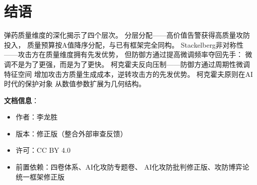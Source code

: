\documentclass[11pt,a4paper]{article}
\begin{document}
\section{结语}

弹药质量维度的深化揭示了四个层次。
分层分配——高价值告警获得高质量攻防投入，
质量预算按A值降序分配，与已有框架完全同构。
Stackelberg非对称性——攻击方在质量维度拥有先发优势，
但防御方通过提高微调频率夺回先手：
微调不是为了更强，而是为了更快。
柯克霍夫反向压制——防御方通过周期性微调特征空间
增加攻击方质量生成成本，逆转攻击方的先发优势。
柯克霍夫原则在AI时代的保护对象
从数值参数扩展为几何结构。

\vspace{5mm}
\noindent\textbf{文档信息}：
\begin{itemize}
    \item 作者：李龙胜
    \item 版本：修正版（整合外部审查反馈）
    \item 许可：CC BY 4.0
    \item 前置依赖：四卷体系、AI化攻防专题卷、
          AI化攻防批判修正版、攻防博弈论统一框架修正版
\end{itemize}
\end{document}
